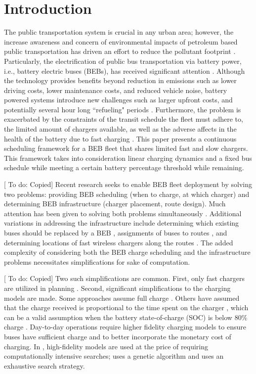 \documentclass[letterpaper, 10pt, conference]{IEEEtran}
\newcommand{\TODO}[1]{{\color{green} To do: #1}} %
\begin{document}
\section{Introduction}
\label{sec:introduction}
The public transportation system is crucial in any urban area; however, the increase awareness and concern of environmental impacts of petroleum based public transportation has driven an effort to reduce the pollutant footprint \cite{DeFilippo2014, Xylia2018, Guida2017, Li2016}. Particularly, the electrification of public bus transportation via battery power, i.e., battery electric buses (BEBs), has received significant attention \cite{Li2016}. Although the technology provides benefits beyond reduction in emissions such as lower driving costs, lower maintenance costs, and reduced vehicle noise, battery powered systems introduce new challenges such as larger upfront costs, and potentially several hour long ``refueling" periods \cite{Xylia2018, Li2016}. Furthermore, the problem is exacerbated by the constraints of the transit schedule the fleet must adhere to, the limited amount of chargers available, as well as the adverse affects in the health of the battery due to fast charging \cite{Lutsey2019}. This paper presents a continuous scheduling framework for a BEB fleet that shares limited fast and slow chargers. This framework takes into consideration linear charging dynamics and a fixed bus schedule while meeting a certain battery percentage threshold while remaining.

[\TODO{Copied}] Recent research seeks to enable BEB fleet deployment by solving two problems: providing BEB scheduling (when to charge, at which charger) and determining BEB infrastructure (charger placement, route design). Much attention has been given to solving both problems simultaneously \cite{Wei2018, Sebastiani2016, Hoke2014, Wang2017}. Additional variations in addressing the infrastructure include determining which existing buses should be replaced by a BEB \cite{Zhou2020}, assignments of buses to routes \cite{Liu2020}, and determining locations of fast wireless chargers along the routes \cite{Yang2018, Wang2017a}. The added complexity of considering both the BEB charge scheduling and the infrastructure problems necessitates simplifications for sake of computation.

[\TODO{Copied}] Two such simplifications are common. First, only fast chargers are utilized in planning \cite{Wei2018, Sebastiani2016, Wang2017, Zhou2020, Liu2020, Yang2018, Wang2017a, Qin2016}. Second, significant simplifications to the charging models are made. Some approaches assume full charge \cite{Wei2018, Wang2017, Zhou2020, Wang2017a}. Others have assumed that the charge received is proportional to the time spent on the charger \cite{Liu2020, Yang2018}, which can be a valid assumption when the battery state-of-charge (SOC) is below 80\% charge \cite{Liu2020}. Day-to-day operations require higher fidelity charging models to ensure buses have sufficient charge and to better incorporate the monetary cost of charging. In \cite{Sebastiani2016, Qin2016}, high-fidelity models are used at the price of requiring computationally intensive searches; \cite{Sebastiani2016} uses a genetic algorithm and \cite{Qin2016} uses an exhaustive search strategy.
\end{document}
